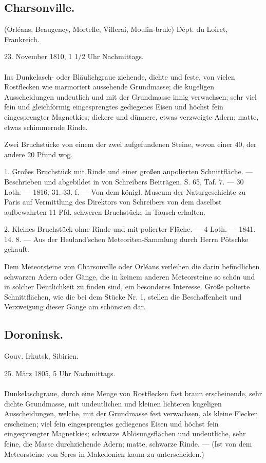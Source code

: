 \documentclass[a4paper, 11pt, oneside, polutonikogreek, german]{article}
\begin{document}
\subsection{Charsonville.}
\begin{center}
\small
(Orléans, Beaugency, Mortelle, Villerai, Moulin-brule) Dépt. du Loiret, Frankreich.

23. November 1810, 1 1/2 Uhr Nachmittags.
\end{center}
\paragraph{}
Ins Dunkelasch- oder Bläulichgraue ziehende, dichte und feste, von vielen Rostflecken wie marmoriert aussehende Grundmasse; die kugeligen Ausscheidungen undeutlich und mit der Grundmasse innig verwachsen; sehr viel fein und gleichförmig eingesprengtes gediegenes Eisen und höchst fein eingesprengter Magnetkies; dickere und dünnere, etwas verzweigte Adern; matte, etwas schimmernde Rinde.

Zwei Bruchstücke von einem der zwei aufgefundenen Steine, wovon einer 40, der andere 20 Pfund wog.

1. Großes Bruchstück mit Rinde und einer großen anpolierten Schnittfläche. — Beschrieben und abgebildet in von Schreibers Beiträgen, S. 65, Taf. 7. — 30 Loth. — 1816. 31. 33. f. — Von dem königl. Museum der Naturgeschichte zu Paris auf Vermittlung des Direktors von Schreibers von dem daselbst aufbewahrten 11 Pfd. schweren Bruchstücke in Tausch erhalten.

2. Kleines Bruchstück ohne Rinde und mit polierter Fläche. — 4 Loth. — 1841. 14. 8. — Aus der Heuland'schen Meteoriten-Sammlung durch Herrn Pötschke gekauft.

Dem Meteorsteine von Charsonville oder Orléans verleihen die darin befindlichen schwarzen Adern oder Gänge, die in keinem anderen Meteorsteine so schön und in solcher Deutlichkeit zu finden sind, ein besonderes Interesse. Große polierte Schnittflächen, wie die bei dem Stücke Nr. 1, stellen die Beschaffenheit und Verzweigung dieser Gänge am schönsten dar.
\subsection{Doroninsk.}
\begin{center}
\small
Gouv. Irkutsk, Sibirien.

25. März 1805, 5 Uhr Nachmittags.
\end{center}
\paragraph{}
Dunkelaschgraue, durch eine Menge von Rostflecken fast braun erscheinende, sehr dichte Grundmasse, mit undeutlichen und kleinen lichteren kugeligen Ausscheidungen, welche, mit der Grundmasse fest verwachsen, als kleine Flecken erscheinen; viel fein eingesprengtes gediegenes Eisen und höchst fein eingesprengter Magnetkies; schwarze Ablösungsflächen und undeutliche, sehr feine, die Masse durchziehende Adern; matte, schwarze Rinde. — (Ist von dem Meteorsteine von Seres in Makedonien kaum zu unterscheiden.)
\end{document}
